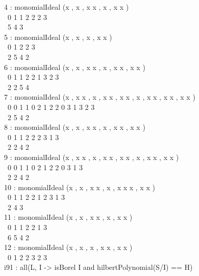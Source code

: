 4 : monomialIdeal (x , x , x x , x , x x )\\
\                    0   1   1 2   2   2 3\\
\emptyLine
\                            5   4 3\\
5 : monomialIdeal (x , x , x , x x )\\
\                    0   1   2   2 3\\
\emptyLine
\                        2         5         4 2\\
6 : monomialIdeal (x , x , x x , x , x x , x x )\\
\                    0   1   1 2   2   1 3   2 3\\
\emptyLine
\                    2         2               5               4\\
7 : monomialIdeal (x , x x , x , x x , x x , x , x x , x x , x x )\\
\                    0   0 1   1   0 2   1 2   2   0 3   1 3   2 3\\
\emptyLine
\                        2         5   4       2\\
8 : monomialIdeal (x , x , x x , x , x x , x x )\\
\                    0   1   1 2   2   2 3   1 3\\
\emptyLine
\                    2         2               4           2\\
9 : monomialIdeal (x , x x , x , x x , x x , x , x x , x x )\\
\                    0   0 1   1   0 2   1 2   2   0 3   1 3\\
\emptyLine
\                         2     2   4             2\\
10 : monomialIdeal (x , x , x x , x , x x x , x x )\\
\                     0   1   1 2   2   1 2 3   1 3\\
\emptyLine
\                         2         4     3\\
11 : monomialIdeal (x , x , x x , x , x x )\\
\                     0   1   1 2   2   1 3\\
\emptyLine
\                             6   5     4 2\\
12 : monomialIdeal (x , x , x , x x , x x )\\
\                     0   1   2   2 3   2 3\\
\endOutput
\beginOutput
i91 : all(L, I -> isBorel I and hilbertPolynomial(S/I) == H)\\
